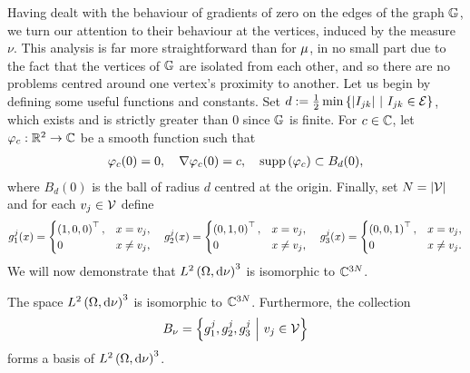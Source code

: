 Having dealt with the behaviour of gradients of zero on the edges of the graph $\mathbb{G}$, we turn our attention to their behaviour at the vertices, induced by the measure $\nu$.
This analysis is far more straightforward than for $\mu$, in no small part due to the fact that the vertices of $\mathbb{G}$ are isolated from each other, and so there are no problems centred around one vertex's proximity to another.
Let us begin by defining some useful functions and constants.
Set $d := \frac{1}{2}\min\left\{ \left\lvert I_{jk} \right\rvert \ \middle\vert \  I_{jk}\in\mathcal{E} \right\}$, which exists and is strictly greater than 0 since $\mathbb{G}$ is finite.
For $c\in\mathbb{C}$, let $\varphi_c:\mathbb{R}^2\rightarrow\mathbb{C}$ be a smooth function such that
\begin{align} \label{eq:NuSmoothVertexFunctionDef}
	\varphi_c(0) = 0, \quad
	\nabla\varphi_c(0) = c, \quad
	\mathrm{supp}\left( \varphi_c \right)\subset B_d(0),
\end{align}
where $B_d(0)$ is the ball of radius $d$ centred at the origin.
Finally, set $N = \left\lvert \mathcal{V} \right\rvert$ and for each $v_j\in\mathcal{V}$ define
\begin{align*}
	g_1^j(x) = \begin{cases} \left( 1,0,0 \right)^\top, & x=v_j, \\ 0 & x\neq v_j, \end{cases}
	\quad
	g_2^j(x) = \begin{cases} \left( 0,1,0 \right)^\top, & x=v_j, \\ 0 & x\neq v_j, \end{cases}
	\quad
	g_3^j(x) = \begin{cases} \left( 0,0,1 \right)^\top, & x=v_j, \\ 0 & x\neq v_j. \end{cases}
\end{align*}
We will now demonstrate that $L^{2}\left( \Omega,\mathrm{d}\nu \right)^3$ is isomorphic to $\mathbb{C}^{3N}$. 
\begin{lemma} \label{lem:L2nuIsomCN}
	The space $L^{2}\left( \Omega,\mathrm{d}\nu \right)^3$ is isomorphic to $\mathbb{C}^{3N}$.
	Furthermore, the collection 
	\begin{align*}
		B_{\nu} = \left\{ g_1^j, g_2^j, g_3^j \ \middle\vert \  v_j\in\mathcal{V} \right\}
	\end{align*} forms a basis of $L^{2}\left( \Omega,\mathrm{d}\nu \right)^3$.
\end{lemma}

